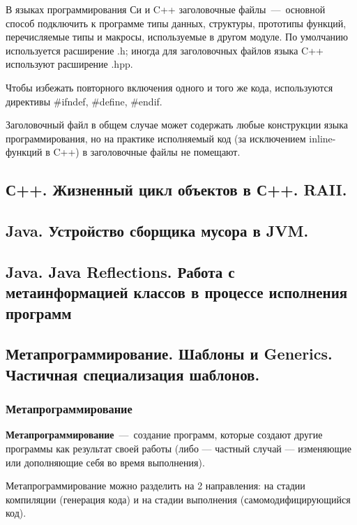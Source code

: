 \documentclass{article}
\begin{document}
В языках программирования Си и C++ заголовочные файлы~---~основной способ подключить к программе типы данных, структуры, прототипы функций, перечисляемые типы и макросы, используемые в другом модуле. По умолчанию используется расширение .h; иногда для заголовочных файлов языка C++ используют расширение .hpp.

Чтобы избежать повторного включения одного и того же кода, используются директивы \#ifndef, \#define, \#endif.

Заголовочный файл в общем случае может содержать любые конструкции языка программирования, но на практике исполняемый код (за исключением inline-функций в C++) в заголовочные файлы не помещают.

\subsection{С++. Жизненный цикл объектов в С++. RAII.}

\subsection{Java. Устройство сборщика мусора в JVM.}

\subsection{Java. Java Reflections. Работа с метаинформацией классов в процессе исполнения программ}

\subsection{Метапрограммирование. Шаблоны и Generics. Частичная специализация шаблонов.}

\subsubsection{Метапрограммирование}

\textbf{Метапрограммирование}~---~создание программ, которые создают другие программы как результат своей работы (либо — частный случай — изменяющие или дополняющие себя во время выполнения).

Метапрограммирование можно разделить на 2 направления: на стадии компиляции (генерация кода) и на стадии выполнения (самомодифицирующийся код).
\end{document}
